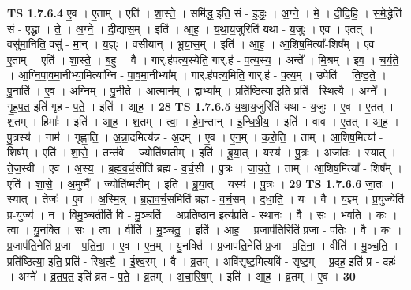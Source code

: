 \documentclass[17pt]{extarticle}
\begin{document}
                  \newline
                                \textbf{ TS 1.7.6.4} \newline
                  ए॒व । ए॒ताम् । एति॑ । शा॒स्ते॒ । समि॑द्ध॒ इति॒ सं - इ॒द्धः॒ । अ॒ग्ने॒ । मे॒ । दी॒दि॒हि॒ । स॒मे॒द्धेति॑ सं - ए॒द्धा । ते॒ । अ॒ग्ने॒ । दी॒द्या॒स॒म् । इति॑ । आ॒ह॒ । य॒था॒य॒जुरिति॑ यथा - य॒जुः । ए॒व । ए॒तत् । वसु॑मा॒निति॒ वसु॑ - मा॒न् । य॒ज्ञ्ः । वसी॑यान् । भू॒या॒स॒म् । इति॑ । आ॒ह॒ । आ॒शिष॒मित्या᳚-शिष᳚म् । ए॒व । ए॒ताम् । एति॑ । शा॒स्ते॒ । ब॒हु । वै । गार्.ह॑पत्य॒स्येति॒ गार्.ह॑ - प॒त्य॒स्य॒ । अन्ते᳚ । मि॒श्रम् । इ॒व॒ । च॒र्य॒ते॒ । आ॒ग्नि॒पा॒व॒मा॒नीभ्या॒मित्या᳚ग्नि - पा॒व॒मा॒नीभ्या᳚म् । गार्.ह॑पत्य॒मिति॒ गार्.ह॑ - प॒त्य॒म् । उपेति॑ । ति॒ष्ठ॒ते॒ । पु॒नाति॑ । ए॒व । अ॒ग्निम् । पु॒नी॒ते । आ॒त्मान᳚म् । द्वाभ्या᳚म् । प्रति॑ष्ठित्या॒ इति॒ प्रति॑ - स्थि॒त्यै॒ । अग्ने᳚ । गृ॒ह॒प॒त॒ इति॑ गृह - प॒ते॒ । इति॑ । आ॒ह॒ । \textbf{  28} \newline
                  \newline
                                \textbf{ TS 1.7.6.5} \newline
                  य॒था॒य॒जुरिति॑ यथा - य॒जुः । ए॒व । ए॒तत् । श॒तम् । हिमाः᳚ । इति॑ । आ॒ह॒ । श॒तम् । त्वा॒ । हे॒म॒न्तान् । इ॒न्धि॒षी॒य॒ । इति॑ । वाव । ए॒तत् । आ॒ह॒ । पु॒त्रस्य॑ । नाम॑ । गृ॒ह्णा॒ति॒ । अ॒न्ना॒दमित्य॑न्न - अ॒दम् । ए॒व । ए॒न॒म् । क॒रो॒ति॒ । ताम् । आ॒शिष॒मित्या᳚ - शिष᳚म् । एति॑ । शा॒से॒ । तन्त॑वे । ज्योति॑ष्मतीम् । इति॑ । ब्रू॒या॒त् । यस्य॑ । पु॒त्रः । अजा॑तः । स्यात् । ते॒ज॒स्वी । ए॒व । अ॒स्य॒ । ब्र॒ह्म॒व॒र्च॒सीति॑ ब्रह्म - व॒र्च॒सी । पु॒त्रः । जा॒य॒ते॒ । ताम् । आ॒शिष॒मित्या᳚ - शिष᳚म् । एति॑ । शा॒से॒ । अ॒मुष्मै᳚ । ज्योति॑ष्मतीम् । इति॑ । ब्रू॒या॒त् । यस्य॑ । पु॒त्रः । \textbf{  29} \newline
                  \newline
                                \textbf{ TS 1.7.6.6} \newline
                  जा॒तः । स्यात् । तेजः॑ । ए॒व । अ॒स्मि॒न्न् । ब्र॒ह्म॒व॒र्च॒समिति॑ ब्रह्म - व॒र्च॒सम् । द॒धा॒ति॒ । यः । वै । य॒ज्ञ्म् । प्र॒युज्येति॑ प्र-युज्य॑ । न । वि॒मु॒ञ्चतीति॑ वि - मु॒ञ्चति॑ । अ॒प्र॒ति॒ष्ठा॒न इत्य॑प्रति - स्था॒नः । वै । सः । भ॒व॒ति॒ । कः । त्वा॒ । यु॒न॒क्ति॒ । सः । त्वा॒ । वीति॑ । मु॒ञ्च॒तु॒ । इति॑ । आ॒ह॒ । प्र॒जाप॑ति॒रिति॑ प्र॒जा - प॒तिः॒ । वै । कः । प्र॒जाप॑ति॒नेति॑ प्र॒जा - प॒ति॒ना॒ । ए॒व । ए॒न॒म् । यु॒नक्ति॑ । प्र॒जाप॑ति॒नेति॑ प्र॒जा - प॒ति॒ना॒ । वीति॑ । मु॒ञ्च॒ति॒ । प्रति॑ष्ठित्या॒ इति॒ प्रति॑ - स्थि॒त्यै॒ । ई॒श्व॒रम् । वै । व्र॒तम् । अवि॑सृष्ट॒मित्यवि॑ - सृ॒ष्ट॒म् । प्र॒दह॒ इति॑ प्र - दहः॑ । अग्ने᳚ । व्र॒त॒प॒त॒ इति॑ व्रत - प॒ते॒ । व्र॒तम् । अ॒चा॒रि॒ष॒म् । इति॑ । आ॒ह॒ । व्र॒तम् । ए॒व । \textbf{  30} \newline
\end{document}

